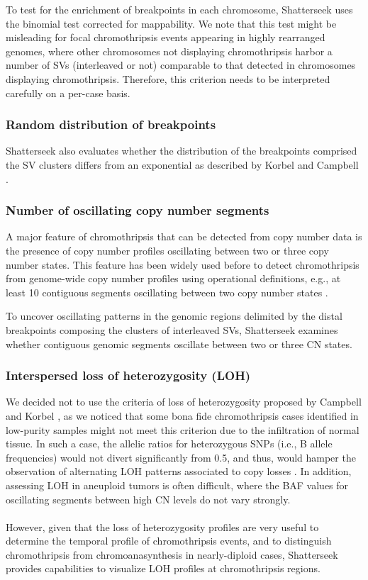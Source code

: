 \documentclass[twoside,a4wide,11pt]{article}\usepackage[]{graphicx}\usepackage[]{color}
\begin{document}
To test for the enrichment of breakpoints in each chromosome,
Shatterseek uses the binomial test corrected for mappability. 
We note that this test might be misleading for focal chromothripsis events
appearing in highly rearranged genomes, where
other chromosomes not displaying chromothripsis harbor a number of SVs (interleaved or not) comparable to that
detected in chromosomes displaying chromothripsis. 
Therefore, this criterion needs to be interpreted carefully on a per-case basis.

\subsubsection{Random distribution of breakpoints}
Shatterseek also evaluates whether the distribution of the breakpoints comprised the SV clusters
differs from an exponential as described by Korbel and Campbell \cite{Korbel2013}.

\subsubsection{Number of oscillating copy number segments}
A major feature of chromothripsis that can be detected from copy number data is the 
presence of copy number profiles oscillating between two or three copy number states.
This feature has been widely used before to detect chromothripsis from 
genome-wide copy number profiles using operational definitions,
e.g., at least 10 contiguous segments oscillating between two copy number states \cite{Rausch2012}. 

To uncover oscillating patterns in the genomic regions delimited by the distal breakpoints composing 
the clusters of interleaved SVs,
Shatterseek examines whether contiguous genomic segments oscillate between two or three CN states. 

\subsubsection{Interspersed loss of heterozygosity (LOH)}

We decided not to use the criteria of loss of heterozygosity proposed by Campbell and Korbel \cite{Korbel2013}, 
as we noticed that some bona fide chromothripsis cases identified in low-purity samples might not meet this criterion due to the infiltration of normal tissue.
In such a case, the allelic ratios for heterozygous SNPs (i.e., B allele frequencies) would not divert significantly from 0.5, and thus, would hamper the observation of alternating LOH patterns associated to copy losses \cite{Song2012}.
In addition, assessing LOH in aneuploid tumors is often difficult,
where the BAF values for oscillating segments between high CN levels do not vary strongly.\\
\\
However, given that the loss of heterozygosity profiles are very useful to
determine the temporal profile of chromothripsis events, 
and to distinguish chromothripsis from chromoanasynthesis in nearly-diploid cases,
Shatterseek provides capabilities to visualize LOH profiles at chromothripsis regions.
\\
\end{document}

